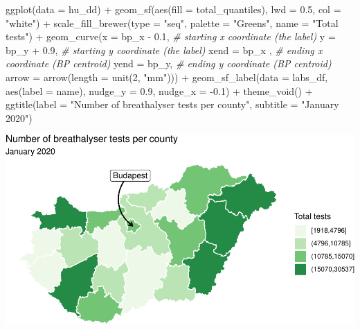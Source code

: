 \documentclass[
]{book}
\makeatletter
\newenvironment{Shaded}{\begin{snugshade}}{\end{snugshade}}
\newcommand{\AttributeTok}[1]{\textcolor[rgb]{0.61,0.61,0.61}{#1}}
\newcommand{\CommentTok}[1]{\textcolor[rgb]{0.37,0.37,0.37}{\textit{#1}}}
\newcommand{\DecValTok}[1]{\textcolor[rgb]{0.06,0.06,0.06}{#1}}
\newcommand{\FloatTok}[1]{\textcolor[rgb]{0.06,0.06,0.06}{#1}}
\newcommand{\FunctionTok}[1]{\textcolor[rgb]{0,0,0}{#1}}
\newcommand{\NormalTok}[1]{#1}
\newcommand{\SpecialCharTok}[1]{\textcolor[rgb]{0,0,0}{#1}}
\newcommand{\StringTok}[1]{\textcolor[rgb]{0.5,0.5,0.5}{#1}}
\newenvironment{kframe}{%
\medskip{}
\setlength{\fboxsep}{.8em}
 \def\at@end@of@kframe{}%
 \ifinner\ifhmode%
  \def\at@end@of@kframe{\end{minipage}}%
  \begin{minipage}{\columnwidth}%
 \fi\fi%
 \def\FrameCommand##1{\hskip\@totalleftmargin \hskip-\fboxsep
 \colorbox{shadecolor}{##1}\hskip-\fboxsep
     \hskip-\linewidth \hskip-\@totalleftmargin \hskip\columnwidth}%
 \MakeFramed {\advance\hsize-\width
   \@totalleftmargin\z@ \linewidth\hsize
   \@setminipage}}%
 {\par\unskip\endMakeFramed%
 \at@end@of@kframe}
\renewenvironment{Shaded}{\begin{kframe}}{\end{kframe}}
\makeatother
\begin{document}
\begin{Shaded}
\begin{Highlighting}[]
\FunctionTok{ggplot}\NormalTok{(}\AttributeTok{data =}\NormalTok{ hu\_dd) }\SpecialCharTok{+} 
  \FunctionTok{geom\_sf}\NormalTok{(}\FunctionTok{aes}\NormalTok{(}\AttributeTok{fill =}\NormalTok{ total\_quantiles), }
          \AttributeTok{lwd =} \FloatTok{0.5}\NormalTok{, }\AttributeTok{col =} \StringTok{"white"}\NormalTok{) }\SpecialCharTok{+} 
  \FunctionTok{scale\_fill\_brewer}\NormalTok{(}\AttributeTok{type =} \StringTok{"seq"}\NormalTok{, }
                    \AttributeTok{palette =} \StringTok{"Greens"}\NormalTok{,}
                    \AttributeTok{name =} \StringTok{"Total tests"}\NormalTok{) }\SpecialCharTok{+} 
  \FunctionTok{geom\_curve}\NormalTok{(}\AttributeTok{x =}\NormalTok{ bp\_x }\SpecialCharTok{{-}} \FloatTok{0.1}\NormalTok{,  }\CommentTok{\# starting x coordinate (the label)}
             \AttributeTok{y =}\NormalTok{ bp\_y }\SpecialCharTok{+} \FloatTok{0.9}\NormalTok{, }\CommentTok{\# starting y coordinate (the label)}
             \AttributeTok{xend =}\NormalTok{ bp\_x , }\CommentTok{\# ending x coordinate (BP centroid)}
             \AttributeTok{yend =}\NormalTok{ bp\_y,  }\CommentTok{\# ending y coordinate (BP centroid)}
             \AttributeTok{arrow =} \FunctionTok{arrow}\NormalTok{(}\AttributeTok{length =} \FunctionTok{unit}\NormalTok{(}\DecValTok{2}\NormalTok{, }\StringTok{"mm"}\NormalTok{))) }\SpecialCharTok{+}
  \FunctionTok{geom\_sf\_label}\NormalTok{(}\AttributeTok{data =}\NormalTok{ labs\_df, }
                \FunctionTok{aes}\NormalTok{(}\AttributeTok{label =}\NormalTok{ name), }
                \AttributeTok{nudge\_y =} \FloatTok{0.9}\NormalTok{, }
                \AttributeTok{nudge\_x =} \SpecialCharTok{{-}}\FloatTok{0.1}\NormalTok{) }\SpecialCharTok{+} 
  \FunctionTok{theme\_void}\NormalTok{() }\SpecialCharTok{+} 
  \FunctionTok{ggtitle}\NormalTok{(}\AttributeTok{label =} \StringTok{"Number of breathalyser tests per county"}\NormalTok{, }
          \AttributeTok{subtitle =} \StringTok{"January 2020"}\NormalTok{)}
\end{Highlighting}
\end{Shaded}

\includegraphics{crime_mapping_files/figure-latex/unnamed-chunk-162-1.pdf}
\end{document}

